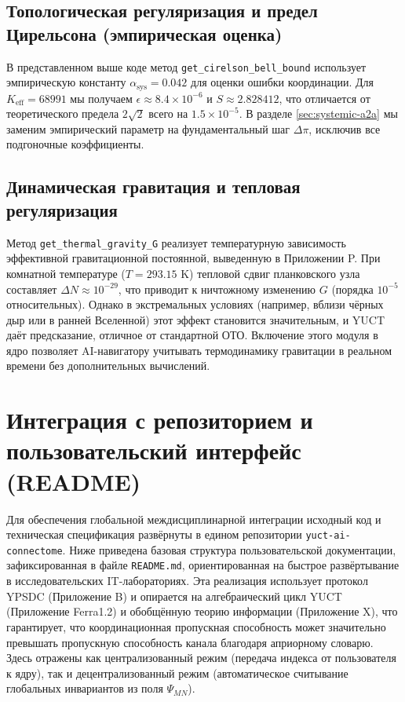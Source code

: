 \documentclass[12pt,a4paper]{article}
\begin{document}
	\subsection{Топологическая регуляризация и предел Цирельсона (эмпирическая оценка)}
	\label{sec:bell-regularization}
	
	В представленном выше коде метод \texttt{get\_cirelson\_bell\_bound} использует эмпирическую константу \(\alpha_{\text{sys}} = 0.042\) для оценки ошибки координации. Для \(K_{\mathrm{eff}} = 68991\) мы получаем \(\epsilon \approx 8.4 \times 10^{-6}\) и \(S \approx 2.828412\), что отличается от теоретического предела \(2\sqrt{2}\) всего на \(1.5 \times 10^{-5}\). В разделе \ref{sec:systemic-a2a} мы заменим эмпирический параметр на фундаментальный шаг \(\Delta\pi\), исключив все подгоночные коэффициенты.
	
	\subsection{Динамическая гравитация и тепловая регуляризация}
	\label{subsec:thermal-gravity}
	
	Метод \texttt{get\_thermal\_gravity\_G} реализует температурную зависимость эффективной гравитационной постоянной, выведенную в Приложении P. При комнатной температуре (\(T = 293.15\) K) тепловой сдвиг планковского узла составляет \(\Delta N \approx 10^{-29}\), что приводит к ничтожному изменению \(G\) (порядка \(10^{-5}\) относительных). Однако в экстремальных условиях (например, вблизи чёрных дыр или в ранней Вселенной) этот эффект становится значительным, и YUCT даёт предсказание, отличное от стандартной ОТО. Включение этого модуля в ядро позволяет AI-навигатору учитывать термодинамику гравитации в реальном времени без дополнительных вычислений.
	
	\section{Интеграция с репозиторием и пользовательский интерфейс (README)}
	Для обеспечения глобальной междисциплинарной интеграции исходный код и техническая спецификация развёрнуты в едином репозитории \texttt{yuct-ai-connectome}. Ниже приведена базовая структура пользовательской документации, зафиксированная в файле \texttt{README.md}, ориентированная на быстрое развёртывание в исследовательских IT-лабораториях. Эта реализация использует протокол YPSDC (Приложение B) и опирается на алгебраический цикл YUCT (Приложение Ferra1.2) и обобщённую теорию информации (Приложение X), что гарантирует, что координационная пропускная способность может значительно превышать пропускную способность канала благодаря априорному словарю. Здесь отражены как централизованный режим (передача индекса от пользователя к ядру), так и децентрализованный режим (автоматическое считывание глобальных инвариантов из поля \(\Psi_{MN}\)).
	
\end{document}
